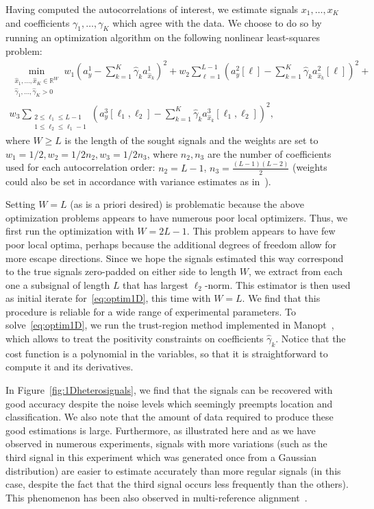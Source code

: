 \documentclass[12pt]{article}
\newcommand{\1}{\mathbf{1}}
\newcommand{\R}{\mathbb{R}}
\theoremstyle{plain}
\theoremstyle{definition}
\theoremstyle{remark}
\theoremstyle{plain}
\theoremstyle{remark}
\theoremstyle{plain}
\theoremstyle{plain}
\theoremstyle{plain}
\numberwithin{equation}{section}
\begin{document}
Having computed the autocorrelations of interest, we estimate signals $x_1, \ldots, x_K$ and coefficients $\gamma_1, \ldots, \gamma_K$ which agree with the data. We choose to do so by running an optimization algorithm on the following nonlinear least-squares problem:
\begin{multline}
	\min_{\substack{\hat x_1, \ldots, \hat x_K \in \R^{W} \\ \hat \gamma_1, \ldots, \hat \gamma_K > 0}} w_1 \left( a_y^1 - \sum_{k=1}^K \hat \gamma_k a_{\hat x_k}^1 \right)^2 + w_2 \sum_{\ell = 1}^{L-1} \left( a_y^2[\ell] - \sum_{k=1}^K \hat \gamma_k a_{\hat x_k}^2[\ell] \right)^2 + \\ w_3 \sum_{\substack{2\leq\ell_1\leq L-1 \\ 1 \leq \ell_2 \leq \ell_1-1}} \left( a_y^3[\ell_1, \ell_2] - \sum_{k=1}^K \hat \gamma_k a_{\hat x_k}^3[\ell_1,\ell_2] \right)^2,
	\label{eq:optim1D}
\end{multline}
where $W \geq L$ is the length of the sought signals and the weights are set to $w_1 = 1/2, w_2 = 1/2n_2, w_3 = 1/2n_3$, where $n_2, n_3$ are the number of coefficients used for each autocorrelation order: $n_2 = L-1$, $n_3 = \frac{(L-1)(L-2)}{2}$ (weights could also be set in accordance with variance estimates as in~\cite{boumal2017heterogeneous}).

Setting $W = L$ (as is a priori desired) is problematic because the above optimization problems appears to have numerous poor local optimizers. Thus, we first run the optimization with $W = 2L-1$. This problem appears to have few poor local optima, perhaps because the additional degrees of freedom allow for more escape directions. Since we hope the signals estimated this way correspond to the true signals zero-padded on either side to length $W$, we extract from each one a subsignal of length $L$ that has largest $\ell_2$-norm. This estimator is then used as initial iterate for~\eqref{eq:optim1D}, this time with $W = L$. We find that this procedure is reliable for a wide range of experimental parameters. To solve~\eqref{eq:optim1D}, we run the trust-region method implemented in Manopt~\cite{manopt}, which allows to treat the positivity constraints on coefficients $\hat \gamma_k$. Notice that the cost function is a polynomial in the variables, so that it is straightforward to compute it and its derivatives.

In Figure~\ref{fig:1Dheterosignals}, we find that the signals can be recovered with good accuracy despite the noise levels which seemingly preempts location and classification. We also note that the amount of data required to produce these good estimations is large. Furthermore, as illustrated here and as we have observed in numerous experiments, signals with more variations (such as the third signal in this experiment which was generated once from a Gaussian distribution) are easier to estimate accurately than more regular signals (in this case, despite the fact that the third signal occurs less frequently than the others).
This phenomenon has been also observed in multi-reference alignment~\cite[Section 3.2]{perry2017sample}.
\end{document}

